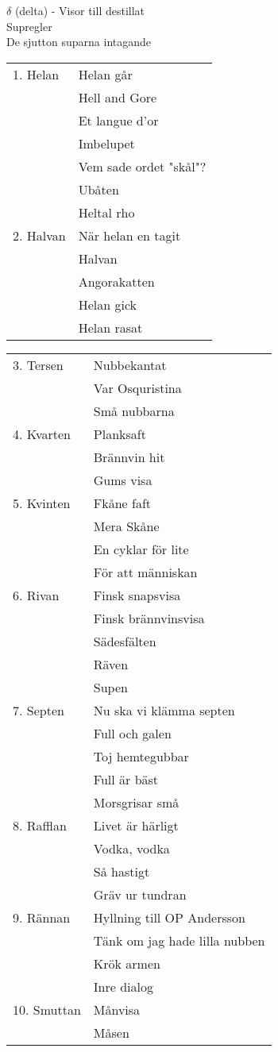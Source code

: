 \documentclass[a6paper,10pt]{article}
\begin{document}
\noindent
\Large $\delta$ (delta) - Visor till destillat
\vspace{3pt}\\
\normalsize   Supregler
\vspace{3pt}\\
    De sjutton suparna intagande
\vspace{-7pt}
\begin{table}[!ht]
\begin{tabularx}{0.8\textwidth}{l X}
1. Helan&Helan går\\
&Hell and Gore\\
&Et langue d'or\\
&Imbelupet\\
&Vem sade ordet "skål"?\\
&Ubåten\\
&Heltal rho\\
2. Halvan&När helan en tagit\\
&Halvan\\
&Angorakatten\\
&Helan gick\\
&Helan rasat\\
\end{tabularx}
\end{table}
\begin{table}[!ht]
\begin{tabularx}{0.9\textwidth}{l X}
3. Tersen&Nubbekantat\\
 &Var Osquristina\\
 &Små nubbarna\\
4. Kvarten&Planksaft\\
 &Brännvin hit\\
 &Gums visa\\
5. Kvinten&Fkåne faft\\
 &Mera Skåne\\
 &En cyklar för lite\\
 &För att människan\\
6. Rivan&Finsk snapsvisa\\
 &Finsk brännvinsvisa\\
 &Sädesfälten\\
 &Räven\\
 &Supen\\
7. Septen&Nu ska vi klämma septen\\
 &Full och galen\\
 &Toj hemtegubbar\\
 &Full är bäst\\
 &Morsgrisar små\\
8. Rafflan&Livet är härligt\\
 &Vodka, vodka\\
 &Så hastigt\\
 &Gräv ur tundran\\
9. Rännan&Hyllning till OP Andersson\\
&Tänk om jag hade lilla nubben\\
&Krök armen\\
&Inre dialog\\
10. Smuttan&Månvisa\\
&Måsen
\end{tabularx}
\end{table}
\end{document}
